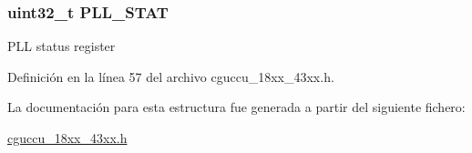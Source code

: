 \subsubsection[{\texorpdfstring{P\+L\+L\+\_\+\+S\+T\+AT}{PLL_STAT}}]{ uint32\+\_\+t P\+L\+L\+\_\+\+S\+T\+AT}\hypertarget{struct_c_g_u___p_l_l___r_e_g___t_a8bc6e383ac2cac7fe5c0e4f9ac0a4fed}{}\label{struct_c_g_u___p_l_l___r_e_g___t_a8bc6e383ac2cac7fe5c0e4f9ac0a4fed}
P\+LL status register 

Definición en la línea 57 del archivo cguccu\+\_\+18xx\+\_\+43xx.\+h.



La documentación para esta estructura fue generada a partir del siguiente fichero\+:\begin{DoxyCompactItemize}
\item 
\hyperlink{cguccu__18xx__43xx_8h}{cguccu\+\_\+18xx\+\_\+43xx.\+h}\end{DoxyCompactItemize}
